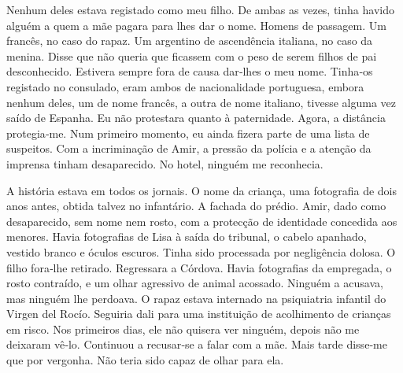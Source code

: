 Nenhum deles estava registado como meu filho. De ambas as vezes, tinha
havido alguém a quem a mãe pagara para lhes dar o nome. Homens de
passagem. Um francês, no caso do rapaz. Um argentino de ascendência
italiana, no caso da menina. Disse que não queria que ficassem com o
peso de serem filhos de pai desconhecido. Estivera sempre fora de causa
dar­‑lhes o meu nome. Tinha­‑os registado no consulado, eram ambos de
nacionalidade portuguesa, embora nenhum deles, um de nome francês, a
outra de nome italiano, tivesse alguma vez saído de Espanha. Eu não
protestara quanto à paternidade. Agora, a distância protegia­‑me. Num
primeiro momento, eu ainda fizera parte de uma lista de suspeitos. Com a
incriminação de Amir, a pressão da polícia e a atenção da imprensa
tinham desaparecido. No hotel, ninguém me reconhecia.

A história estava em todos os jornais. O nome da criança, uma fotografia
de dois anos antes, obtida talvez no infantário. A fachada do prédio.
Amir, dado como desaparecido, sem nome nem rosto, com a protecção de
identidade concedida aos menores. Havia fotografias de Lisa à saída do
tribunal, o cabelo apanhado, vestido branco e óculos escuros. Tinha sido
processada por negligência dolosa. O filho fora­‑lhe retirado.
Regressara a Córdova. Havia fotografias da empregada, o rosto contraído,
e um olhar agressivo de animal acossado. Ninguém a acusava, mas ninguém
lhe perdoava. O rapaz estava internado na psiquiatria infantil do Virgen
del Rocío. Seguiria dali para uma instituição de acolhimento de crianças
em risco. Nos primeiros dias, ele não quisera ver ninguém, depois não me
deixaram vê­‑lo. Continuou a recusar­‑se a falar com a mãe. Mais tarde
disse­‑me que por vergonha. Não teria sido capaz de olhar para ela.

